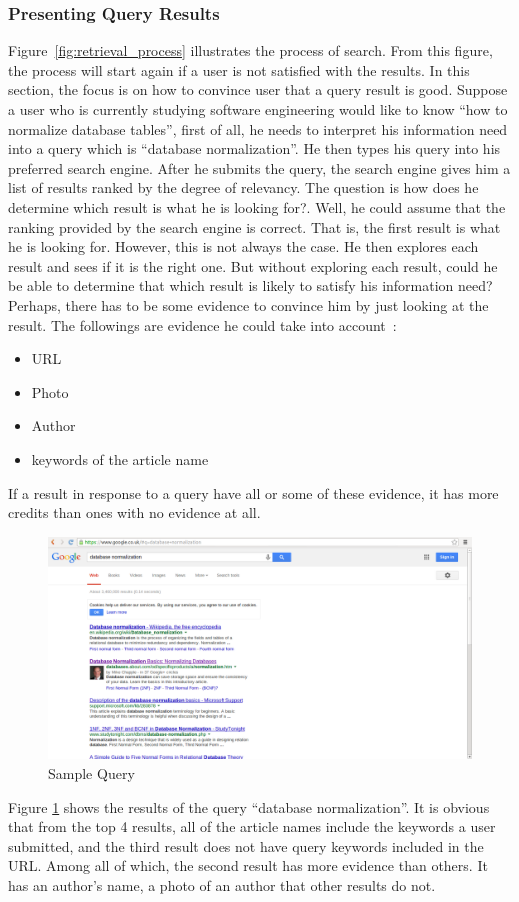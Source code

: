 \subsubsection{Presenting Query Results}\label{sec:presentingQueryResult}
Figure~\ref{fig:retrieval_process} illustrates the process of search. From this figure, the process will start again if a user is not satisfied with 
the results. In this section, the focus is on how to convince user that a query result is good. Suppose a user who is currently studying software engineering
would like to know ``how to normalize database tables'', first of all, he needs to interpret his information need into a query which is ``database normalization''.
He then types his query into his preferred search engine. After he submits the query, the search engine gives him a list of results ranked by the degree
of relevancy. The question is how does he determine which result is what he is looking for?. Well, he could assume that the ranking provided by the search 
engine is correct. That is, the first result is what he is looking for. However, this is not always the case. He then explores each result and sees if 
it is the right one. But without exploring each result, could he be able to determine that which result is likely to satisfy his information need?
Perhaps, there has to be some evidence to convince him by just looking at the result. The followings are evidence he could take into account~\cite{craig}: 
\begin{itemize}
 \item URL
 \item Photo
 \item Author
 \item keywords of the article name
\end{itemize}
If a result in response to a query have all or some of these evidence, it has more credits than ones with no evidence at all. 
\begin{figure}
\centering
\includegraphics[scale=0.3]{./figures/query.png}
\caption{Sample Query} \label{fig:query}
\end{figure}
Figure \ref{fig:query} shows the results of the query ``database normalization''. It is obvious that from the top 4 results, all of the article names
include the keywords a user submitted, and the third result does not have query keywords included in the URL. Among all of which, the second result has more 
evidence than others. It has an author's name, a photo of an author that other results do not.

